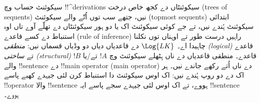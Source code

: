 \documentclass[../../../include/open-logic-section]{subfiles}
\begin{document}
سیکوئنٹ حساب وچ !!^{derivation}s سیکوئنٹاں دے کجھ خاص درخت (trees of
sequents) نیں، جتھے سب توں اُتّے والے سیکوئنٹ (topmost sequents)
ابتدائی سیکوئنٹ ہُندے نیں، تے جے کوئی
سیکوئنٹ اک یا دو ہور سیکوئنٹاں دے تھلّے آوے تاں اوہ استنباط دے کسے
قاعدے (rule of inference) راہیں درست طور تے اوہناں توں نکلنا چاہیدا اے۔ $\Log{LK}$ دے
قاعدیاں دیاں دو وڈیاں قسماں نیں:
\emph{منطقی (logical)} قاعدے تے \emph{ساختی (structural)} قاعدے۔ منطقی قاعدیاں دے ناں ہِٹھلے
سیکوئنٹ وچ $!A$ تے/یا $!B$ والے !!{sentence} دے !!{main
  operator} (main operator) دے ناں اُتے رکھے جاندے نیں۔ ہر اک دے دو روپ ہُندے نیں:
اک اوس سیکوئنٹ دا استنباط کرن لئی جیہدے کھبے پاسے !!{operator} والا
!!{sentence} ہووے، تے اک اوس لئی جیہدے سجے پاسے ایہ !!{sentence} ہووے۔
\end{document}
